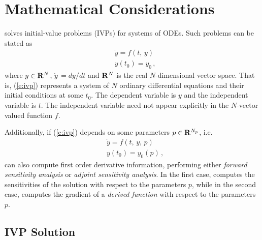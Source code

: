 \section{Mathematical Considerations}\label{s:math}

{\cvodes} solves initial-value problems (IVPs) for systems of ODEs. 
Such problems can be stated as
\begin{equation}\label{e:ivp}
\begin{split}
&\dot{y} = f(t,\,y) \\
&y(t_0) = y_0 \, ,
\end{split}
\end{equation}
where $y \in {\bf R}^N$, $\dot{y}\,=dy/dt$ and ${\bf R}^N$ is the real $N$-dimensional
vector space. That is, (\ref{e:ivp}) represents a system of $N$ ordinary
differential equations and their initial conditions at some $t_0$. The
dependent variable is $y$ and the independent variable is $t$. The
independent variable need not appear explicitly in the $N$-vector valued
function $f$.

Additionally, if (\ref{e:ivp}) depends on some parameters $p \in {\bf R}^{N_p}$, i.e.
\begin{equation}\label{e:ivp_p}
\begin{split}
&\dot{y}  = f(t,\,y,\,p) \\
&y(t_0)  = y_0(p) \, ,
\end{split}
\end{equation}
{\cvodes} can also compute first order derivative information, performing either
{\em forward sensitivity analysis} or {\em adjoint sensitivity analysis}.
In the first case, {\cvodes} computes the sensitivities of the solution with respect to the 
parameters $p$, while in the second case, {\cvodes} computes the gradient of a 
{\em derived function} with respect to the parameters $p$.

\subsection{IVP Solution}\label{ss:ivp_sol}

